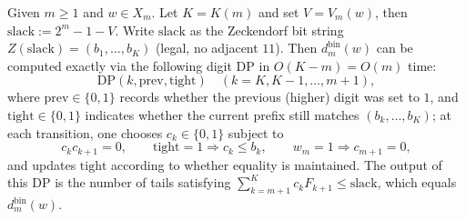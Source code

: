 \begin{proposition}\label{prop:fold-bin-digit-dp}
Given \(m\ge 1\) and \(w\in X_m\). Let \(K=K(m)\) and set \(V=V_m(w)\), then \(\mathrm{slack}:=2^m-1-V\).
Write \(\mathrm{slack}\) as the Zeckendorf bit string \(Z(\mathrm{slack})=(b_1,\dots,b_K)\) (legal, no adjacent \(11\)).
Then \(d^{\mathrm{bin}}_m(w)\) can be computed exactly via the following digit DP in \(O(K-m)=O(m)\) time:
\[
\mathrm{DP}(k,\mathrm{prev},\mathrm{tight})
\quad(k=K,K-1,\dots,m+1),
\]
where \(\mathrm{prev}\in\{0,1\}\) records whether the previous (higher) digit was set to \(1\), and \(\mathrm{tight}\in\{0,1\}\) indicates whether the current prefix still matches \((b_k,\dots,b_K)\);
at each transition, one chooses \(c_k\in\{0,1\}\) subject to
\[
c_k c_{k+1}=0,\qquad
\mathrm{tight}=1\Rightarrow c_k\le b_k,\qquad
w_m=1\Rightarrow c_{m+1}=0,
\]
and updates \(\mathrm{tight}\) according to whether equality is maintained. The output of this DP is the number of tails satisfying \(\sum_{k=m+1}^K c_k F_{k+1}\le \mathrm{slack}\), which equals \(d^{\mathrm{bin}}_m(w)\).
\end{proposition}


